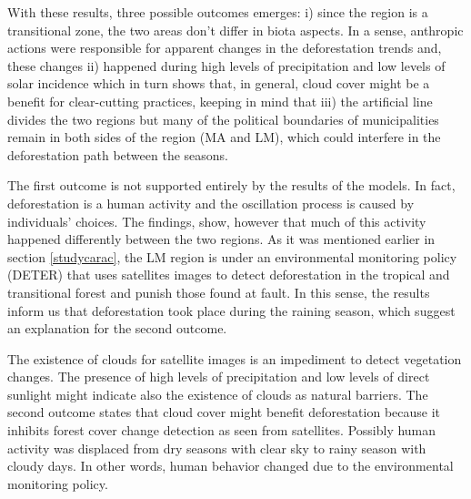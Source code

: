 With these results, three possible outcomes emerges: i) since the region is a transitional zone, the two areas don't differ in biota aspects. In a sense, anthropic actions were responsible for apparent changes in the deforestation trends and, these changes ii) happened during high levels of precipitation and low levels of solar incidence which in turn shows that, in general, cloud cover might be a benefit for clear-cutting practices, keeping in mind that iii) the artificial line divides the two regions but many of the political boundaries of municipalities remain in both sides of the region (MA and LM), which could interfere in the deforestation path between the seasons.


The first outcome is not supported entirely by the results of the models. In fact, deforestation is a human activity and the oscillation process is caused by individuals' choices. The findings, show, however that much of this activity happened differently between the two regions. As it was mentioned earlier in section \ref{studycarac}, the LM region is under an environmental monitoring policy (DETER) that uses satellites images to detect deforestation in the tropical and transitional forest and punish those found at fault. In this sense, the results inform us that deforestation took place during the raining season, which suggest an explanation for the second outcome. 


The existence of clouds for satellite images is an impediment to detect vegetation changes. The presence of high levels of precipitation and low levels of direct sunlight might indicate also the existence of clouds as natural barriers. The second outcome states that cloud cover might benefit deforestation because it inhibits forest cover change detection as seen from satellites. Possibly human activity was displaced from dry seasons with clear sky to rainy season with cloudy days. In other words, human behavior changed due to the environmental monitoring policy. 


